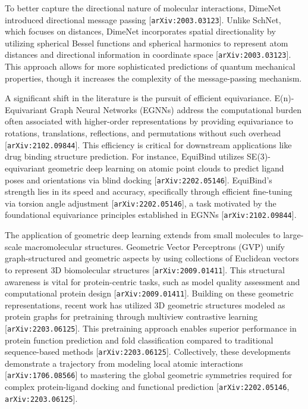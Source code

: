 \documentclass[11pt]{article}
\begin{document}
To better capture the directional nature of molecular interactions, DimeNet introduced directional message passing [\texttt{arXiv:2003.03123}]. Unlike SchNet, which focuses on distances, DimeNet incorporates spatial directionality by utilizing spherical Bessel functions and spherical harmonics to represent atom distances and directional information in coordinate space [\texttt{arXiv:2003.03123}]. This approach allows for more sophisticated predictions of quantum mechanical properties, though it increases the complexity of the message-passing mechanism.

A significant shift in the literature is the pursuit of efficient equivariance. E(n)-Equivariant Graph Neural Networks (EGNNs) address the computational burden often associated with higher-order representations by providing equivariance to rotations, translations, reflections, and permutations without such overhead [\texttt{arXiv:2102.09844}]. This efficiency is critical for downstream applications like drug binding structure prediction. For instance, EquiBind utilizes SE(3)-equivariant geometric deep learning on atomic point clouds to predict ligand poses and orientations via blind docking [\texttt{arXiv:2202.05146}]. EquiBind's strength lies in its speed and accuracy, specifically through efficient fine-tuning via torsion angle adjustment [\texttt{arXiv:2202.05146}], a task motivated by the foundational equivariance principles established in EGNNs [\texttt{arXiv:2102.09844}].

The application of geometric deep learning extends from small molecules to large-scale macromolecular structures. Geometric Vector Perceptrons (GVP) unify graph-structured and geometric aspects by using collections of Euclidean vectors to represent 3D biomolecular structures [\texttt{arXiv:2009.01411}]. This structural awareness is vital for protein-centric tasks, such as model quality assessment and computational protein design [\texttt{arXiv:2009.01411}]. Building on these geometric representations, recent work has utilized 3D geometric structures modeled as protein graphs for pretraining through multiview contrastive learning [\texttt{arXiv:2203.06125}]. This pretraining approach enables superior performance in protein function prediction and fold classification compared to traditional sequence-based methods [\texttt{arXiv:2203.06125}]. Collectively, these developments demonstrate a trajectory from modeling local atomic interactions [\texttt{arXiv:1706.08566}] to mastering the global geometric symmetries required for complex protein-ligand docking and functional prediction [\texttt{arXiv:2202.05146}, \texttt{arXiv:2203.06125}].
\end{document}
